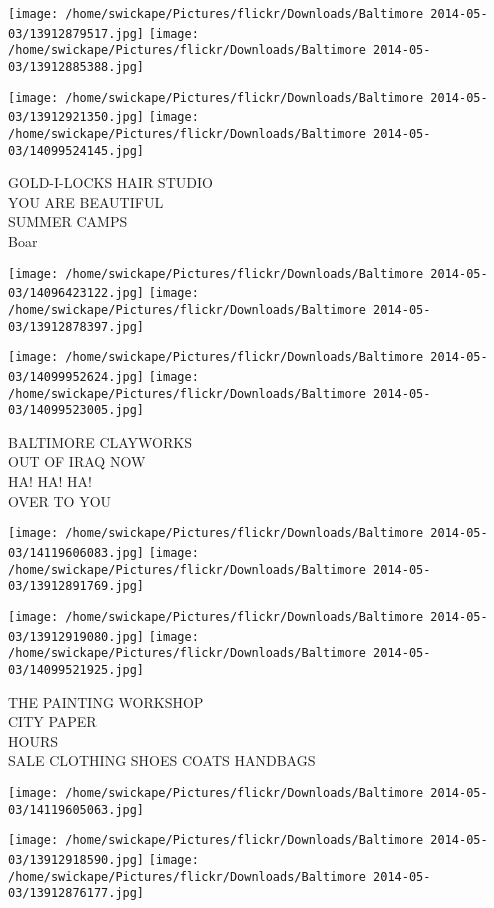 \documentclass[10pt,letterpaper]{article}
\begin{document}
\texttt{[image: /home/swickape/Pictures/flickr/Downloads/Baltimore 2014-05-03/13912879517.jpg]}
\texttt{[image: /home/swickape/Pictures/flickr/Downloads/Baltimore 2014-05-03/13912885388.jpg]}

\texttt{[image: /home/swickape/Pictures/flickr/Downloads/Baltimore 2014-05-03/13912921350.jpg]}
\texttt{[image: /home/swickape/Pictures/flickr/Downloads/Baltimore 2014-05-03/14099524145.jpg]}

GOLD{-}I{-}LOCKS HAIR STUDIO\\
YOU ARE BEAUTIFUL\\
SUMMER CAMPS\\
Boar
\pagebreak

\texttt{[image: /home/swickape/Pictures/flickr/Downloads/Baltimore 2014-05-03/14096423122.jpg]}
\texttt{[image: /home/swickape/Pictures/flickr/Downloads/Baltimore 2014-05-03/13912878397.jpg]}

\texttt{[image: /home/swickape/Pictures/flickr/Downloads/Baltimore 2014-05-03/14099952624.jpg]}
\texttt{[image: /home/swickape/Pictures/flickr/Downloads/Baltimore 2014-05-03/14099523005.jpg]}

BALTIMORE CLAYWORKS\\
OUT OF IRAQ NOW\\
HA! HA! HA!\\
OVER TO YOU
\pagebreak

\texttt{[image: /home/swickape/Pictures/flickr/Downloads/Baltimore 2014-05-03/14119606083.jpg]}
\texttt{[image: /home/swickape/Pictures/flickr/Downloads/Baltimore 2014-05-03/13912891769.jpg]}

\texttt{[image: /home/swickape/Pictures/flickr/Downloads/Baltimore 2014-05-03/13912919080.jpg]}
\texttt{[image: /home/swickape/Pictures/flickr/Downloads/Baltimore 2014-05-03/14099521925.jpg]}

THE PAINTING WORKSHOP\\
CITY PAPER\\
HOURS\\
SALE CLOTHING SHOES COATS HANDBAGS
\pagebreak

\texttt{[image: /home/swickape/Pictures/flickr/Downloads/Baltimore 2014-05-03/14119605063.jpg]}

\vspace{0.25in}
\texttt{[image: /home/swickape/Pictures/flickr/Downloads/Baltimore 2014-05-03/13912918590.jpg]}
\texttt{[image: /home/swickape/Pictures/flickr/Downloads/Baltimore 2014-05-03/13912876177.jpg]}
\end{document}
